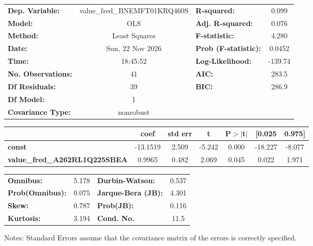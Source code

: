 \begin{center}
\begin{tabular}{lclc}
\toprule
\textbf{Dep. Variable:}               & value\_fred\_BNEMFT01KRQ460S & \textbf{  R-squared:         } &     0.099   \\
\textbf{Model:}                       &             OLS              & \textbf{  Adj. R-squared:    } &     0.076   \\
\textbf{Method:}                      &        Least Squares         & \textbf{  F-statistic:       } &     4.280   \\
\textbf{Date:}                        &       Sun, 22 Nov 2026       & \textbf{  Prob (F-statistic):} &   0.0452    \\
\textbf{Time:}                        &           18:45:52           & \textbf{  Log-Likelihood:    } &   -139.74   \\
\textbf{No. Observations:}            &                41            & \textbf{  AIC:               } &     283.5   \\
\textbf{Df Residuals:}                &                39            & \textbf{  BIC:               } &     286.9   \\
\textbf{Df Model:}                    &                 1            & \textbf{                     } &             \\
\textbf{Covariance Type:}             &          nonrobust           & \textbf{                     } &             \\
\bottomrule
\end{tabular}
\begin{tabular}{lcccccc}
                                      & \textbf{coef} & \textbf{std err} & \textbf{t} & \textbf{P$> |$t$|$} & \textbf{[0.025} & \textbf{0.975]}  \\
\midrule
\textbf{const}                        &     -13.1519  &        2.509     &    -5.242  &         0.000        &      -18.227    &       -8.077     \\
\textbf{value\_fred\_A262RL1Q225SBEA} &       0.9965  &        0.482     &     2.069  &         0.045        &        0.022    &        1.971     \\
\bottomrule
\end{tabular}
\begin{tabular}{lclc}
\textbf{Omnibus:}       &  5.178 & \textbf{  Durbin-Watson:     } &    0.537  \\
\textbf{Prob(Omnibus):} &  0.075 & \textbf{  Jarque-Bera (JB):  } &    4.301  \\
\textbf{Skew:}          &  0.787 & \textbf{  Prob(JB):          } &    0.116  \\
\textbf{Kurtosis:}      &  3.194 & \textbf{  Cond. No.          } &     11.5  \\
\bottomrule
\end{tabular}
\end{center}

Notes: \newline
 [1] Standard Errors assume that the covariance matrix of the errors is correctly specified.